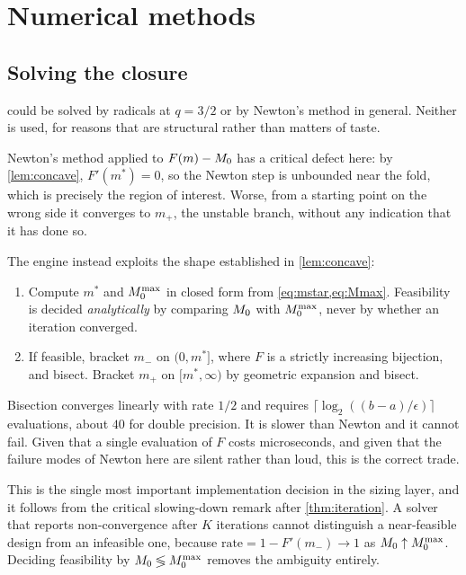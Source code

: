 ﻿\section{Numerical methods}
\label{sec:numerics}

\subsection{Solving the closure}

 could be solved by radicals at $q=3/2$ or by Newton's
method in general. Neither is used, for reasons that are structural rather than
matters of taste.

Newton's method applied to $F(m)-M_0$ has a critical defect here: by
\cref{lem:concave}, $F'(m^*)=0$, so the Newton step is unbounded near the fold,
which is precisely the region of interest. Worse, from a starting point on the
wrong side it converges to $m_+$, the unstable branch, without any indication
that it has done so.

The engine instead exploits the shape established in \cref{lem:concave}:

\begin{enumerate}[nosep]
  \item Compute $m^*$ and $M_0^{\max}$ in closed form from
        \cref{eq:mstar,eq:Mmax}. Feasibility is decided \emph{analytically} by
        comparing $M_0$ with $M_0^{\max}$, never by whether an iteration
        converged.
  \item If feasible, bracket $m_-$ on $(0,m^*]$, where $F$ is a strictly
        increasing bijection, and bisect. Bracket $m_+$ on $[m^*,\infty)$ by
        geometric expansion and bisect.
\end{enumerate}

Bisection converges linearly with rate $1/2$ and requires
$\lceil\log_2((b-a)/\epsilon)\rceil$ evaluations, about $40$ for double
precision. It is slower than Newton and it cannot fail. Given that a single
evaluation of $F$ costs microseconds, and given that the failure modes of
Newton here are silent rather than loud, this is the correct trade.

\begin{remark}
This is the single most important implementation decision in the sizing layer,
and it follows from the critical slowing-down remark after
\cref{thm:iteration}. A solver that reports non-convergence after $K$ iterations
cannot distinguish a near-feasible design from an infeasible one, because
$\mathrm{rate} = 1-F'(m_-)\to1$ as $M_0\uparrow M_0^{\max}$. Deciding feasibility
by $M_0\lessgtr M_0^{\max}$ removes the ambiguity entirely.
\end{remark}

